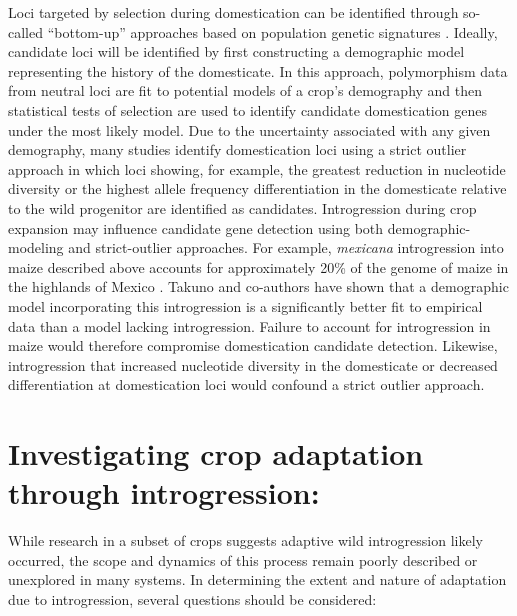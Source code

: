\documentclass[11pt]{article}
\begin{document}
{Loci targeted by selection during domestication can be identified through so-called ``bottom-up'' approaches based on population genetic signatures \citep{Ross-Ibarra2007}.
Ideally, candidate loci will be identified by first constructing a demographic model representing the history of the domesticate.
In this approach, polymorphism data from neutral loci are fit to potential models of a crop's demography and then statistical tests of selection are used to identify candidate domestication genes under the most likely model.
Due to the uncertainty associated with any given demography, many studies identify domestication loci using a strict outlier approach in which loci showing, for example, the greatest reduction in nucleotide diversity or the highest allele frequency differentiation in the domesticate relative to the wild progenitor are identified as candidates.
Introgression during crop expansion may influence candidate gene detection using both demographic-modeling and strict-outlier approaches.
For example, \emph{mexicana} introgression into maize described above accounts for approximately 20\% of the genome of maize in the highlands of Mexico \citep{vanHeerwaarden2011}.
Takuno and co-authors \citeyearpar{Takuno2015} have shown that a demographic model incorporating this introgression is a significantly better fit to empirical data than a model lacking introgression.
Failure to account for introgression in maize would therefore compromise domestication candidate detection.
Likewise, introgression that increased nucleotide diversity in the domesticate or decreased differentiation at domestication loci would confound a strict outlier approach.

\section*{Investigating crop adaptation through introgression:}

While research in a subset of crops suggests adaptive wild introgression likely occurred, the scope and dynamics of this process remain poorly described or unexplored in many systems.
In determining the extent and nature of adaptation due to introgression, several questions should be considered:

}
\end{document}

